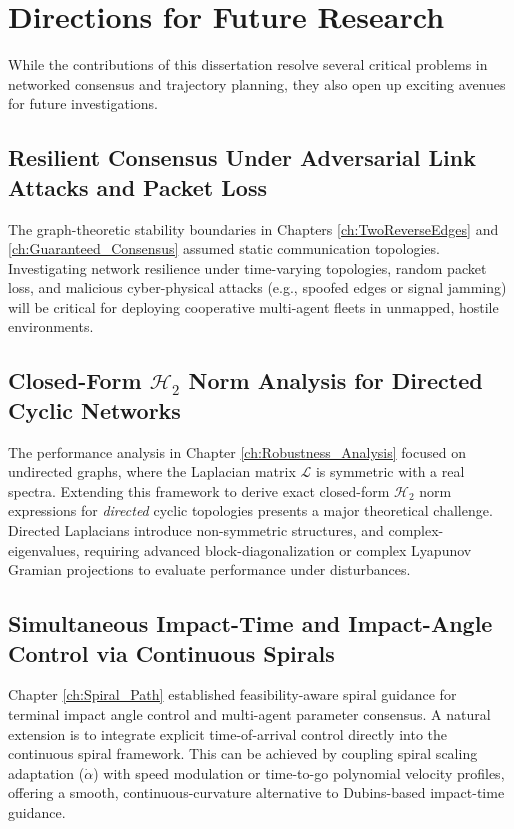 \section{Directions for Future Research}\label{sec:ch_con_future_work}
While the contributions of this dissertation resolve several critical problems in networked consensus and trajectory planning, they also open up exciting avenues for future investigations.

\subsection{Resilient Consensus Under Adversarial Link Attacks and Packet Loss}
The graph-theoretic stability boundaries in Chapters \ref{ch:TwoReverseEdges} and \ref{ch:Guaranteed_Consensus} assumed static communication topologies. Investigating network resilience under time-varying topologies, random packet loss, and malicious cyber-physical attacks (e.g., spoofed edges or signal jamming) will be critical for deploying cooperative multi-agent fleets in unmapped, hostile environments.

\subsection{Closed-Form $\mathcal{H}_2$ Norm Analysis for Directed Cyclic Networks}
The performance analysis in Chapter \ref{ch:Robustness_Analysis} focused on undirected graphs, where the Laplacian matrix $\mathcal{L}$ is symmetric with a real spectra. Extending this framework to derive exact closed-form $\mathcal{H}_2$ norm expressions for \emph{directed} cyclic topologies presents a major theoretical challenge. Directed Laplacians introduce non-symmetric structures, and complex-eigenvalues, requiring advanced block-diagonalization or complex Lyapunov Gramian projections to evaluate performance under disturbances.

\subsection{Simultaneous Impact-Time and Impact-Angle Control via Continuous Spirals}
Chapter \ref{ch:Spiral_Path} established feasibility-aware spiral guidance for terminal impact angle control and multi-agent parameter consensus. A natural extension is to integrate explicit time-of-arrival control directly into the continuous spiral framework. This can be achieved by coupling spiral scaling adaptation ($\dot{\alpha}$) with speed modulation or time-to-go polynomial velocity profiles, offering a smooth, continuous-curvature alternative to Dubins-based impact-time guidance.

